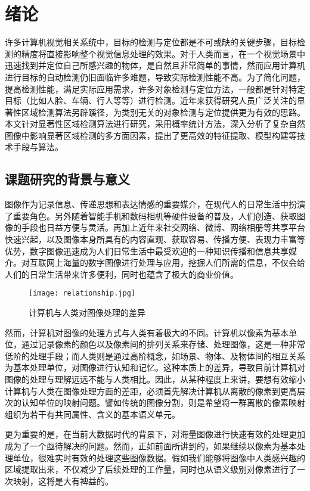 
\chapter{绪论}
许多计算机视觉相关系统中，目标的检测与定位都是不可或缺的关键步骤，目标检测的精度将直接影响整个视觉信息处理的效果。对于人类而言，在一个视觉场景中迅速找到并定位自己所感兴趣的物体，是自然且非常简单的事情，然而应用计算机进行目标的自动检测仍旧面临许多难题，导致实际检测性能不高。为了简化问题，提高检测性能，满足实际应用需求，许多对象检测与定位方法，一般都是针对特定目标（比如人脸、车辆、行人等等）进行检测。近年来获得研究人员广泛关注的显著性区域检测算法另辟蹊径，为类别无关的对象检测与定位提供更为有效的思路。本文针对显著性区域检测算法进行研究，采用概率统计方法，深入分析了复杂自然图像中影响显著区域检测的多方面因素，提出了更高效的特征提取、模型构建等技术手段与算法。

\section{课题研究的背景与意义}
图像作为记录信息、传递思想和表达情感的重要媒介，在现代人的日常生活中扮演了重要角色。另外随着智能手机和数码相机等硬件设备的普及，人们创造、获取图像的手段也日益方便与灵活。再加上近年来社交网络、微博、网络相册等共享平台快速兴起，以及图像本身所具有的内容直观、获取容易、传播方便、表现力丰富等优势，数字图像迅速成为人们日常生活中最受欢迎的一种知识传播和信息共享媒介\cite{CMM12THU}。对互联网上海量的数字图像进行处理与应用，挖掘人们所需的信息，不仅会给人们的日常生活带来许多便利，同时也蕴含了极大的商业价值。

\begin{figure}[h]
\centering
\texttt{[image: relationship.jpg]}
\caption{计算机与人类对图像处理的差异}
\end{figure}

然而，计算机对图像的处理方式与人类有着极大的不同。计算机以像素为基本单位，通过记录像素的颜色以及像素间的排列关系来存储、处理图像，这是一种非常低阶的处理手段；而人类则是通过高阶概念，如场景、物体、及物体间的相互关系为基本处理单位，对图像进行认知和记忆。这种本质上的差异，导致目前计算机对图像的处理与理解远远不能与人类相比。因此，从某种程度上来讲，要想有效缩小计算机与人类在图像处理方面的差距，必须首先解决计算机从离散的像素到更高层次的认知单位的映射问题。譬如传统的图像分割，则是希望将一群离散的像素映射组织为若干有共同属性、含义的基本语义单元。

更为重要的是，在当前大数据时代的背景下，对海量图像进行快速有效的处理更加成为了一个亟待解决的问题。然而，正如前面所讲到的，如果继续以像素为基本处理单位，很难实时有效的处理这些图像数据。假如我们能够将图像中人类感兴趣的区域提取出来，不仅减少了后续处理的工作量，同时也从语义级别对像素进行了一次映射，这将是大有裨益的。

